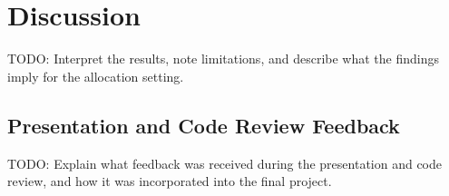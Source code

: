 \section{Discussion}

TODO: Interpret the results, note limitations, and describe what the findings imply for the allocation setting.

\subsection{Presentation and Code Review Feedback}
TODO: Explain what feedback was received during the presentation and code review, and how it was incorporated into the final project.
